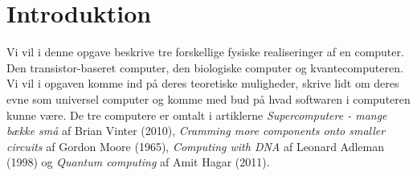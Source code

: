 \section{Introduktion}
Vi vil i denne opgave beskrive tre forskellige fysiske realiseringer af en computer. Den transistor-baseret computer, den biologiske computer og kvantecomputeren. Vi vil i opgaven komme ind på deres teoretiske muligheder, skrive lidt om deres evne som universel computer og komme med bud på hvad softwaren i computeren kunne være. De tre computere er omtalt i artiklerne {\it Supercomputere - mange bække små} af Brian Vinter (2010), {\it Cramming more components onto smaller circuits} af Gordon Moore (1965), {\it Computing with DNA} af Leonard Adleman (1998) og {\it Quantum computing} af Amit Hagar (2011).
